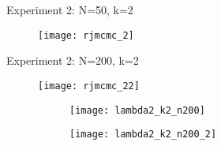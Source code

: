 \documentclass{article}
\begin{document}
\clearpage
Experiment 2: N=50, k=2
\begin{figure}[h]
\centering
\texttt{[image: rjmcmc\_2]}
\end{figure}

Experiment 2: N=200, k=2
\begin{figure}[h]
\centering
\texttt{[image: rjmcmc\_22]}
\end{figure}
\begin{figure}[h]
\centering
\begin{subfigure}{0.4 \textwidth}
\texttt{[image: lambda2\_k2\_n200]}
\end{subfigure}
\begin{subfigure}{0.4 \textwidth}
\texttt{[image: lambda2\_k2\_n200\_2]}
\end{subfigure}
\end{figure}

%
\end{document}
